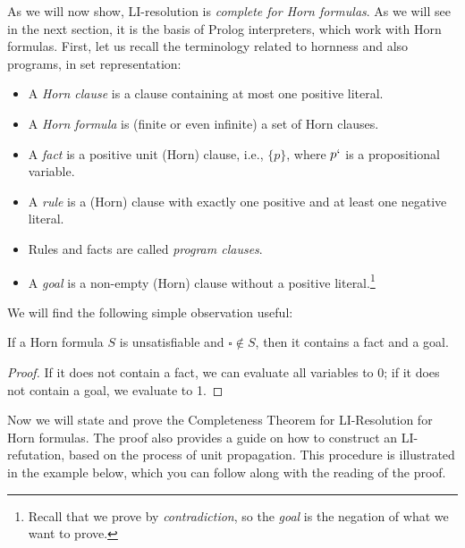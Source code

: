 As we will now show, LI-resolution is \emph{complete for Horn formulas}. As we will see in the next section, it is the basis of Prolog interpreters, which work with Horn formulas. First, let us recall the terminology related to hornness and also programs, in set representation:

\begin{itemize}
    \item A \emph{Horn clause} is a clause containing at most one positive literal.
    \item A \emph{Horn formula} is (finite or even infinite) a set of Horn clauses.
    \item A \emph{fact} is a positive unit (Horn) clause, i.e., $\{p\}$, where $p`$ is a propositional variable.
    \item A \emph{rule} is a (Horn) clause with exactly one positive and at least one negative literal.
    \item Rules and facts are called \emph{program clauses}.
    \item A \emph{goal} is a non-empty (Horn) clause without a positive literal.\footnote{Recall that we prove by \emph{contradiction}, so the \emph{goal} is the negation of what we want to prove.}
\end{itemize}

We will find the following simple observation useful:

\begin{observation}\label{observation:horn-fact-goal}
    If a Horn formula $S$ is unsatisfiable and $\square\notin S$, then it contains a fact and a goal.
\end{observation}
\begin{proof}
    If it does not contain a fact, we can evaluate all variables to 0; if it does not contain a goal, we evaluate to 1.
\end{proof}

Now we will state and prove the Completeness Theorem for LI-Resolution for Horn formulas. The proof also provides a guide on how to construct an LI-refutation, based on the process of unit propagation. This procedure is illustrated in the example below, which you can follow along with the reading of the proof.

